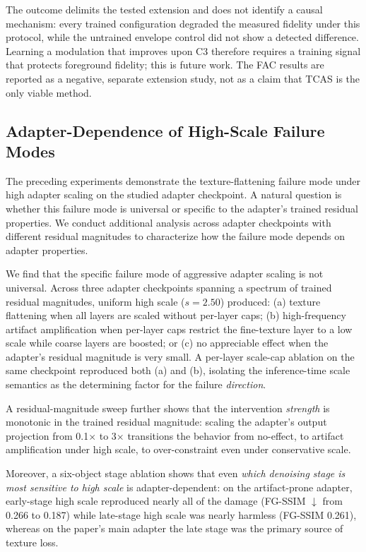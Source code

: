 \documentclass[times,twocolumn,final]{elsarticle}
\begin{document}
The outcome delimits the tested extension and does not identify a causal mechanism: every trained configuration degraded the measured fidelity under this protocol, while the untrained envelope control did not show a detected difference. Learning a modulation that improves upon C3 therefore requires a training signal that protects foreground fidelity; this is future work. The FAC results are reported as a negative, separate extension study, not as a claim that TCAS is the only viable method.

\FloatBarrier

\iffalse
\subsection{Adapter-Dependence of High-Scale Failure Modes}
\label{subsec:adapterdep}

The preceding experiments demonstrate the texture-flattening failure mode under high adapter scaling on the studied adapter checkpoint. A natural question is whether this failure mode is universal or specific to the adapter's trained residual properties. We conduct additional analysis across adapter checkpoints with different residual magnitudes to characterize how the failure mode depends on adapter properties.

We find that the specific failure mode of aggressive adapter scaling is not universal. Across three adapter checkpoints spanning a spectrum of trained residual magnitudes, uniform high scale ($s = 2.50$) produced: (a) texture flattening when all layers are scaled without per-layer caps; (b) high-frequency artifact amplification when per-layer caps restrict the fine-texture layer to a low scale while coarse layers are boosted; or (c) no appreciable effect when the adapter's residual magnitude is very small. A per-layer scale-cap ablation on the same checkpoint reproduced both (a) and (b), isolating the inference-time scale semantics as the determining factor for the failure \emph{direction}.

A residual-magnitude sweep further shows that the intervention \emph{strength} is monotonic in the trained residual magnitude: scaling the adapter's output projection from 0.1$\times$ to 3$\times$ transitions the behavior from no-effect, to artifact amplification under high scale, to over-constraint even under conservative scale.

Moreover, a six-object stage ablation shows that even \emph{which denoising stage is most sensitive to high scale} is adapter-dependent: on the artifact-prone adapter, early-stage high scale reproduced nearly all of the damage (FG-SSIM $\downarrow$ from 0.266 to 0.187) while late-stage high scale was nearly harmless (FG-SSIM 0.261), whereas on the paper's main adapter the late stage was the primary source of texture loss.
\end{document}
